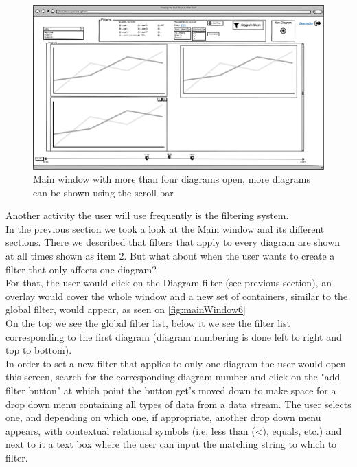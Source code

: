 \documentclass[twoside, english, final]{Pflichtenheft}
\begin{document}
\begin{figure}[h]
	\centering
	\label{fig:mainWindow4}
	\includegraphics[width=\textwidth]{Images/06MW.png}
	\caption{Main window with more than four diagrams open, more diagrams can be shown using the scroll bar}
	\label{fig:mainWindow4}
\end{figure}

Another activity the user will use frequently is the filtering system.
\\
In the previous section we took a look at the Main window and its different sections. There we described that filters that apply to every diagram are shown at all times shown as item 2. But what about when the user wants to create a filter that only affects one diagram?
\\
For that, the user would click on the Diagram filter (see previous section), an overlay would cover the whole window and a new set of containers, similar to the global filter, would appear, as seen on \autoref{fig:mainWindow6}
\\
On the top we see the global filter list, below it we see the filter list corresponding to the first diagram (diagram numbering is done left to right and top to bottom).
\\
In order to set a new filter that applies to only one diagram the user would open this screen, search for the corresponding diagram number and click on the "add filter button" at which point the button get's moved down to make space for a drop down menu containing all types of data from a data stream. The user selects one, and depending on which one, if appropriate, another drop down menu appears, with contextual relational symbols (i.e. less than (<), equals, etc.) and next to it a text box where the user can input the matching string to which to filter.
\end{document}
